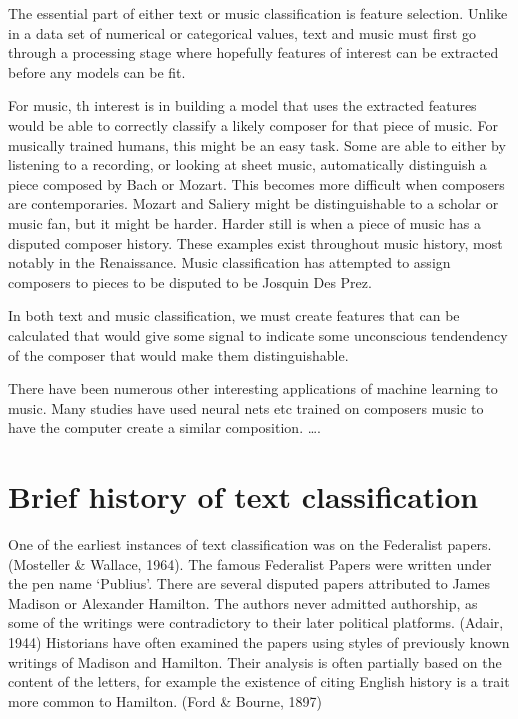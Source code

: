 \documentclass[12pt,twoside]{reedthesis}
\theoremstyle{definition}
\theoremstyle{definition}
\theoremstyle{definition}
\theoremstyle{remark}
\begin{document}
The essential part of either text or music classification is feature
selection. Unlike in a data set of numerical or categorical values, text
and music must first go through a processing stage where hopefully
features of interest can be extracted before any models can be fit.

For music, th interest is in building a model that uses the extracted
features would be able to correctly classify a likely composer for that
piece of music. For musically trained humans, this might be an easy
task. Some are able to either by listening to a recording, or looking at
sheet music, automatically distinguish a piece composed by Bach or
Mozart. This becomes more difficult when composers are contemporaries.
Mozart and Saliery might be distinguishable to a scholar or music fan,
but it might be harder. Harder still is when a piece of music has a
disputed composer history. These examples exist throughout music
history, most notably in the Renaissance. Music classification has
attempted to assign composers to pieces to be disputed to be Josquin Des
Prez.

In both text and music classification, we must create features that can
be calculated that would give some signal to indicate some unconscious
tendendency of the composer that would make them distinguishable.

There have been numerous other interesting applications of machine
learning to music. Many studies have used neural nets etc trained on
composers music to have the computer create a similar composition.
\ldots{}.

\section{Brief history of text
classification}\label{brief-history-of-text-classification}

One of the earliest instances of text classification was on the
Federalist papers.(Mosteller \& Wallace, 1964). The famous Federalist
Papers were written under the pen name `Publius'. There are several
disputed papers attributed to James Madison or Alexander Hamilton. The
authors never admitted authorship, as some of the writings were
contradictory to their later political platforms. (Adair, 1944)
Historians have often examined the papers using styles of previously
known writings of Madison and Hamilton. Their analysis is often
partially based on the content of the letters, for example the existence
of citing English history is a trait more common to Hamilton. (Ford \&
Bourne, 1897)
\end{document}
